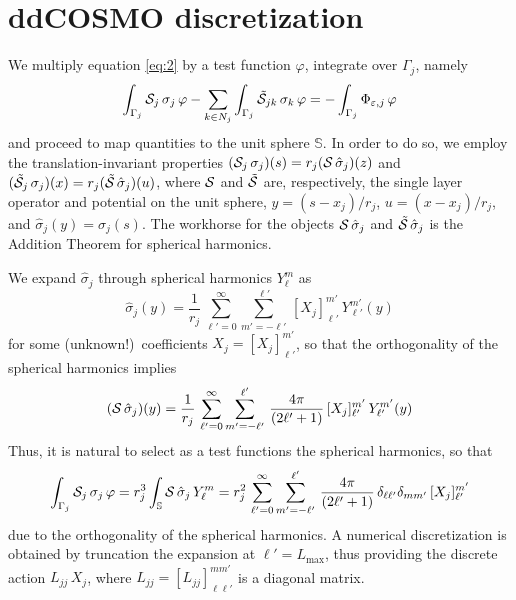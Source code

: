 \section{ddCOSMO discretization \label{app:mats}}
We multiply equation \eqref{eq:2} by a test function $\varphi$, integrate over $\Gamma_j$, namely
\begin{equation}\label{eq:50}
\int_{\Gamma_j} \mathcal{S}_j \, \sigma_j \, \varphi - \sum_{k \in N_j} \int_{\Gamma_j} \tilde{\mathcal{S}}_{jk} \, \sigma_k \, \varphi = -\int_{\Gamma_j}  \Phi_{\varepsilon,j} \, \varphi
\end{equation}
and proceed to map quantities to the unit sphere $\mathbb{S}$. In order to do so, we employ the translation-invariant properties $(\mathcal{S}_j \, \sigma_j)(s) = r_j( \mathcal{S} \, \hat{\sigma}_j)(z)$ and $(\tilde{\mathcal{S}}_j \, \sigma_j)(x) = r_j( \tilde{\mathcal{S}} \, \hat{\sigma}_j)(u)$, where $\mathcal{S}$ and $\tilde{\mathcal{S}}$ are, respectively, the single layer operator and potential on the unit sphere, $y = (s - x_j)/r_j$, $u = (x - x_j)/r_j$, and $\hat{\sigma}_j(y) = \sigma_j(s)$. The workhorse for the objects $\mathcal{S} \, \hat{\sigma}_j$ and $\tilde{\mathcal{S}} \, \hat{\sigma}_j$ is the Addition Theorem for spherical harmonics.

We expand $\hat{\sigma}_j$ through spherical harmonics $Y_\ell^m$ as
\[
\hat{\sigma}_j(y) = \frac{1}{r_j} \, \sum_{\ell'= 0}^{\infty} \sum_{m' = -\ell'}^{\ell'} \,  [X_j]_{\ell'}^{m'} \, Y_{\ell'}^{m'}(y)
\]
for some (unknown!)~coefficients $X_j = [X_j]_{\ell'}^{m'}$, so that the orthogonality of the spherical harmonics implies
\[
(\mathcal{S} \, \hat{\sigma}_j)(y) = \frac{1}{r_j} \, \sum_{\ell'= 0}^{\infty} \sum_{m' = -\ell'}^{\ell'} \, \frac{4\pi}{(2\ell' + 1)}\, [X_j]_{\ell'}^{m'} \, Y_{\ell'}^{m'}(y)
\]
Thus, it is natural to select as a test functions the spherical harmonics, so that
\begin{equation}\label{eq:51}
\int_{\Gamma_j} \mathcal{S}_j \, \sigma_j \, \varphi =  r_j^3 \int_\mathbb{S} \mathcal{S} \, \hat{\sigma}_j \, Y_\ell^m = r_j^2 \, \sum_{\ell'= 0}^{\infty} \sum_{m' = -\ell'}^{\ell'} \, \frac{4\pi}{(2\ell' + 1)} \, \delta_{\ell \ell'} \delta_{m m'}\, [X_j]_{\ell'}^{m'} 
\end{equation}
due to the orthogonality of the spherical harmonics. A numerical discretization is obtained by truncation the expansion at $\ell'=L_\text{max}$, thus providing the discrete action $L_{jj} \, X_j$, where $L_{jj} = [L_{jj}]_{\ell \ell'}^{m m'}$ is a diagonal matrix.

